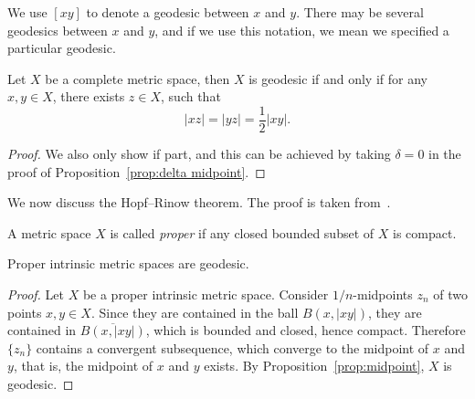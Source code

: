 \begin{nota}
    We use $[xy]$ to denote a geodesic between $x$ and $y$.
    There may be several geodesics between $x$ and $y$, and if we use this notation, we mean we specified a particular geodesic.
\end{nota}

\begin{prop}\label{prop:midpoint}
    Let $X$ be a complete metric space, then $X$ is geodesic if and only if for any $x,y\in X$, there exists $z\in X$, such that
    \[|xz|=|yz|=\frac{1}{2}|xy|.\]
\end{prop}
\begin{proof}
    We also only show if part, and this can be achieved by taking $\delta=0$ in the proof of Proposition~\ref{prop:delta midpoint}.
\end{proof}

We now discuss the Hopf--Rinow theorem.
The proof is taken from~\cite[2.15]{alexanderAlexandrovGeometry2024}.

\begin{defn}
    A metric space $X$ is called \emph{proper} if any closed bounded subset of $X$ is compact.
\end{defn}

\begin{lem}
    Proper intrinsic metric spaces are geodesic.
\end{lem}
\begin{proof}
    Let $X$ be a proper intrinsic metric space.
    Consider $1/n$-midpoints $z_n$ of two points $x,y\in X$.
    Since they are contained in the ball $B(x,|xy|)$, they are contained in $\overline{B(x,|xy|)}$, which is bounded and closed, hence compact.
    Therefore $\{z_n\}$ contains a convergent subsequence, which converge to the midpoint of $x$ and $y$, that is, the midpoint of $x$ and $y$ exists.
    By Proposition~\ref{prop:midpoint}, $X$ is geodesic.
\end{proof}

